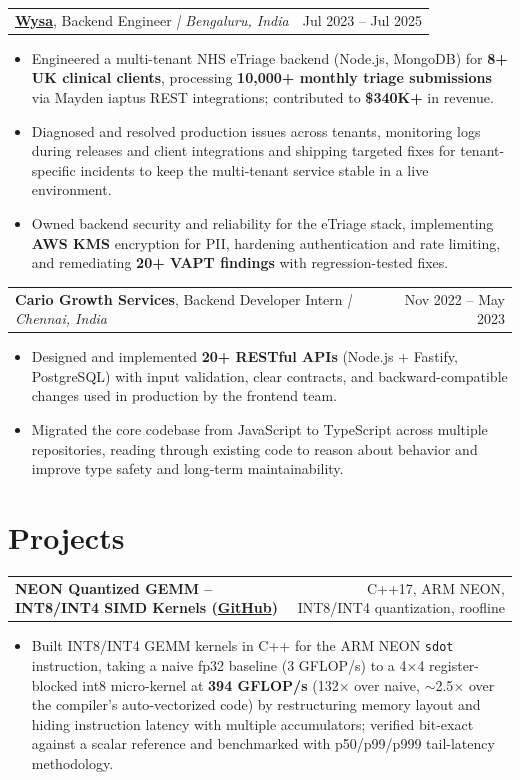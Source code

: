 \documentclass[letterpaper,11pt]{article}
\makeatletter
\newcommand{\expItem}[4]{%
  \vspace{2pt}
  \begin{tabular*}{\textwidth}{@{}l@{\extracolsep{\fill}}r@{}}
    \textbf{#1}, #2 \textit{| #3} & #4 \\
  \end{tabular*}\par\vspace{-3pt}
}
\newcommand{\projItem}[2]{%
  \vspace{2pt}
  \begin{tabular*}{\textwidth}{@{}l@{\extracolsep{\fill}}r@{}}
    \textbf{#1} & #2 \\
  \end{tabular*}\par\vspace{-3pt}
}
\makeatother
\begin{document}
\expItem{\href{https://www.wysa.io}{Wysa}}{Backend Engineer}{Bengaluru, India}{Jul 2023 -- Jul 2025}
\begin{itemize}
  \item Engineered a multi-tenant NHS eTriage backend (Node.js, MongoDB) for \textbf{8+ UK clinical clients}, processing \textbf{10{,}000+ monthly triage submissions} via Mayden iaptus REST integrations; contributed to \textbf{\$340K+} in revenue.
  \item Diagnosed and resolved production issues across tenants, monitoring logs during releases and client integrations and shipping targeted fixes for tenant-specific incidents to keep the multi-tenant service stable in a live environment.
  \item Owned backend security and reliability for the eTriage stack, implementing \textbf{AWS KMS} encryption for PII, hardening authentication and rate limiting, and remediating \textbf{20+ VAPT findings} with regression-tested fixes.
\end{itemize}

\expItem{Cario Growth Services}{Backend Developer Intern}{Chennai, India}{Nov 2022 -- May 2023}
\begin{itemize}
  \item Designed and implemented \textbf{20+ RESTful APIs} (Node.js + Fastify, PostgreSQL) with input validation, clear contracts, and backward-compatible changes used in production by the frontend team.
  \item Migrated the core codebase from JavaScript to TypeScript across multiple repositories, reading through existing code to reason about behavior and improve type safety and long-term maintainability.
\end{itemize}

\section{Projects}

\projItem{NEON Quantized GEMM -- INT8/INT4 SIMD Kernels {\normalfont\small(\href{https://github.com/Deva-1903/neon-quantized-gemm}{GitHub})}}{C++17, ARM NEON, INT8/INT4 quantization, roofline}
\begin{itemize}
  \item Built INT8/INT4 GEMM kernels in C++ for the ARM NEON \texttt{sdot} instruction, taking a naive fp32 baseline (3 GFLOP/s) to a 4$\times$4 register-blocked int8 micro-kernel at \textbf{394 GFLOP/s} (132$\times$ over naive, $\sim$2.5$\times$ over the compiler's auto-vectorized code) by restructuring memory layout and hiding instruction latency with multiple accumulators; verified bit-exact against a scalar reference and benchmarked with p50/p99/p999 tail-latency methodology.
\end{itemize}
\end{document}
